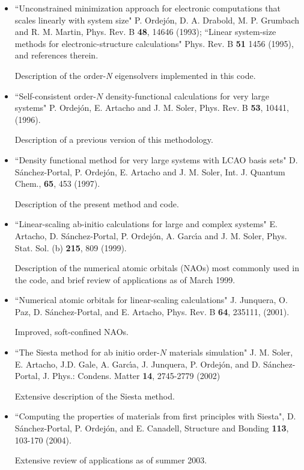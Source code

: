 \documentclass[11pt]{article}
\begin{document}
\begin{itemize}

\item
``Unconstrained minimization approach for electronic computations
that scales linearly with system size"
P. Ordej\'on, D. A. Drabold, M. P. Grumbach and R. M. Martin, 
Phys. Rev. B {\bf 48}, 14646 (1993); 
``Linear system-size methods for electronic-structure calculations"
Phys. Rev. B {\bf 51} 1456 (1995), and references therein.

Description of the order-{\it N} eigensolvers
implemented in this code.

\item
``Self-consistent order-$N$ density-functional 
calculations for very large systems"
P. Ordej\'on, E. Artacho and J. M. Soler,
Phys. Rev. B {\bf 53}, 10441, (1996).

Description of a previous version of this methodology.

\item
``Density functional method for very large systems with LCAO basis sets"
D. S\'anchez-Portal, P. Ordej\'on, E. Artacho and J. M. Soler,
Int. J. Quantum Chem., {\bf 65}, 453 (1997).

Description of the present method and code.

\item
``Linear-scaling ab-initio calculations for large and complex systems"
E. Artacho, D. S\'anchez-Portal, P. Ordej\'on, A. Garc\'{\i}a and
J. M. Soler, Phys. Stat. Sol. (b) {\bf 215}, 809 (1999).

Description of the numerical atomic orbitals (NAOs) most commonly 
used in the code, and brief review of applications as of March 1999.

\item
``Numerical atomic orbitals for linear-scaling calculations"
J. Junquera, O. Paz, D. S\'anchez-Portal, and E. Artacho, Phys. Rev. B
 {\bf 64}, 235111, (2001).

Improved, soft-confined NAOs.

\item
``The {\sc Siesta} method for ab initio order-$N$ materials simulation"
J. M. Soler, E. Artacho, J.D. Gale, A. Garc\'{\i}a, J. Junquera, P. Ordej\'on,
and D. S\'anchez-Portal, J. Phys.: Condens. Matter {\bf 14}, 2745-2779 (2002) 

Extensive description of the {\sc Siesta} method.

\item 
``Computing the properties of materials from first principles 
with  {\sc Siesta}", D. S\'anchez-Portal, P. Ordej\'on, 
and E. Canadell, Structure and Bonding {\bf 113},
103-170 (2004).

Extensive review of applications as of summer 2003.
\end{itemize}
\end{document}
